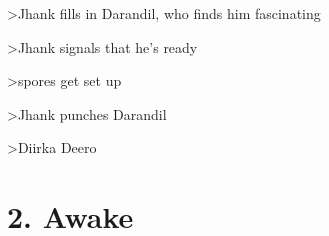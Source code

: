 \documentclass[letterpaper,10pt,twoside,twocolumn,openany]{book}
\begin{document}
>Jhank fills in Darandil, who finds him fascinating

>Jhank signals that he's ready 

>spores get set up

>Jhank punches Darandil

>Diirka Deero

\chapter{2. Awake}




\end{document}
